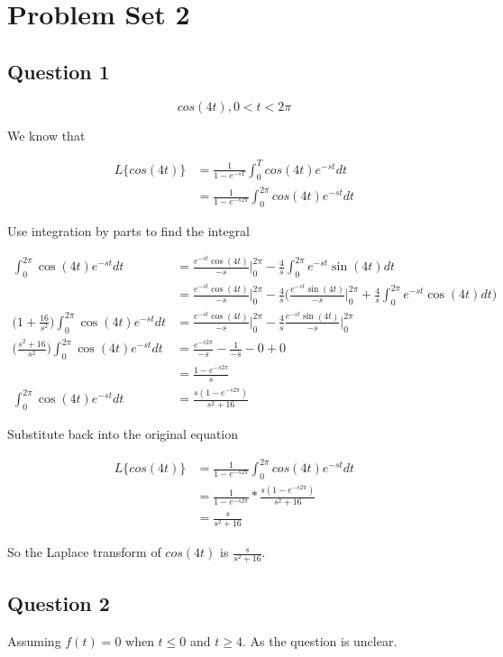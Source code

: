 \documentclass[titlepage]{article}
\begin{document}
\section{Problem Set 2}
\subsection{Question 1}
$$cos(4t), 0 < t < 2\pi$$

\noindent We know that

\begin{align*}
  L\{cos(4t)\} &= \frac{1}{1 - e^{-sT}} \int_0^T cos(4t)e^{-st} dt
  \\&= \frac{1}{1 - e^{-s2\pi}} \int_0^{2\pi} cos(4t)e^{-st} dt
\end{align*}

\noindent Use integration by parts to find the integral

\begin{align*}
  \int_0^{2\pi} \cos(4t)e^{-st} dt &= \frac{e^{-st}\cos(4t)}{-s}\Big|_0^{2\pi} - \frac{4}{s} \int_0^{2\pi} e^{-st}\sin(4t) dt
  \\&= \frac{e^{-st}\cos(4t)}{-s}\Big|_0^{2\pi} - \frac{4}{s} \bigg(\frac{e^{-st}\sin(4t)}{-s}\Big|_0^{2\pi} + \frac{4}{s}\int_0^{2\pi}e^{-st}\cos(4t) dt\bigg)
  \\\bigg(1 + \frac{16}{s^2}\bigg)\int_0^{2\pi} \cos(4t)e^{-st} dt &= \frac{e^{-st}\cos(4t)}{-s}\Big|_0^{2\pi} - \frac{4}{s}\frac{e^{-st}\sin(4t)}{-s}\Big|_0^{2\pi}
  \\\bigg(\frac{s^2 + 16}{s^2}\bigg)\int_0^{2\pi} \cos(4t)e^{-st} dt &= \frac{e^{-s2\pi}}{-s} - \frac{1}{-s} - 0 + 0
  \\&= \frac{1 - e^{-s2\pi}}{s}
  \\\int_0^{2\pi} \cos(4t)e^{-st} dt &= \frac{s(1 - e^{-s2\pi})}{s^2 + 16}
\end{align*}

\noindent Substitute back into the original equation

\begin{align*}
  L\{cos(4t)\} &= \frac{1}{1 - e^{-s2\pi}} \int_0^{2\pi} cos(4t)e^{-st} dt
  \\&= \frac{1}{1 - e^{-s2\pi}} * \frac{s(1 - e^{-s2\pi})}{s^2 + 16}
  \\&= \frac{s}{s^2 + 16}
\end{align*}

\noindent So the Laplace transform of $cos(4t)$ is $\frac{s}{s^2 + 16}$.

\subsection{Question 2}
Assuming $f(t) = 0$ when $t \le 0$ and $t \ge 4$. As the question is unclear.
\end{document}
